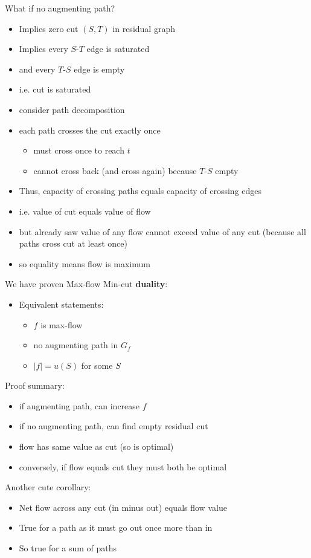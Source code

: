\documentclass{article}
\begin{document}
What if no augmenting path?
  \begin{itemize}
\item Implies zero cut $(S,T)$ in residual graph
\item Implies every $S$-$T$ edge is saturated
  \item and every $T$-$S$ edge is empty
\item i.e. cut is saturated
\item consider path decomposition
\item each path crosses the cut exactly once
  \begin{itemize}
  \item must cross once to reach $t$
  \item cannot cross back (and cross again) because $T$-$S$ empty
  \end{itemize}
\item Thus, capacity of crossing paths equals capacity of crossing edges
\item i.e. value of cut equals value of flow
\item but already saw value of any flow cannot exceed
  value of any cut (because all paths cross cut at least once)
\item so equality means flow is maximum
  \end{itemize}

We have proven Max-flow Min-cut \textbf{duality}:
\begin{itemize}
\item Equivalent statements:
  \begin{itemize}
  \item $f$ is max-flow
  \item no augmenting path in $G_f$
  \item $|f| = u(S)$ for some $S$
  \end{itemize}
\end{itemize}

Proof summary:
\begin{itemize}
\item if augmenting path, can increase $f$
\item if no augmenting path, can find empty residual cut
\item flow has same value as cut (so is optimal)
\item conversely, if flow equals cut they must both be optimal
\end{itemize}

Another cute corollary:
\begin{itemize}
\item Net flow across any cut (in minus out) equals flow value
\item True for a path as it must go out once more than in
\item So true for a sum of paths
\end{itemize}
\end{document}
